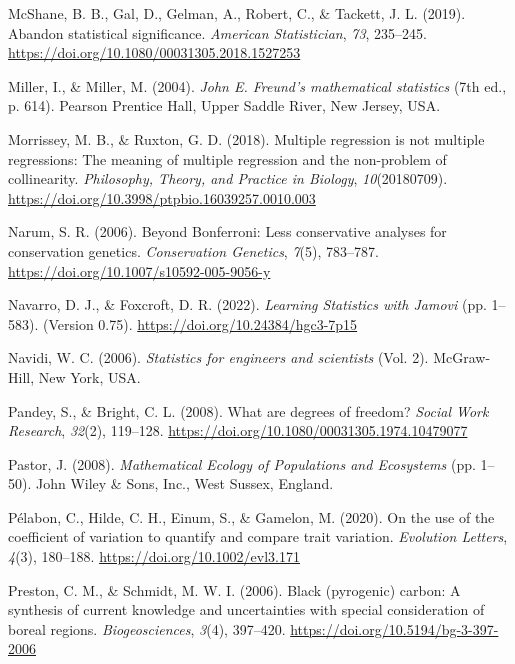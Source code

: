 \documentclass[
  openany]{krantz}
\newlength{\cslhangindent}
\newlength{\cslentryspacingunit} %
\newenvironment{CSLReferences}[2] %
 {%
  \setlength{\parindent}{0pt}
  \ifodd #1
  \let\oldpar\par
  \def\par{\hangindent=\cslhangindent\oldpar}
  \fi
  \setlength{\parskip}{#2\cslentryspacingunit}
 }%
 {}
\begin{document}
\begin{CSLReferences}{1}{0}
\leavevmode{}%
McShane, B. B., Gal, D., Gelman, A., Robert, C., \& Tackett, J. L. (2019). Abandon statistical significance. \emph{American Statistician}, \emph{73}, 235--245. \url{https://doi.org/10.1080/00031305.2018.1527253}

\leavevmode{}%
Miller, I., \& Miller, M. (2004). \emph{{John E. Freund's mathematical statistics}} (7th ed., p. 614). Pearson Prentice Hall, Upper Saddle River, New Jersey, USA.

\leavevmode{}%
Morrissey, M. B., \& Ruxton, G. D. (2018). Multiple regression is not multiple regressions: The meaning of multiple regression and the non-problem of collinearity. \emph{Philosophy, Theory, and Practice in Biology}, \emph{10}(20180709). \url{https://doi.org/10.3998/ptpbio.16039257.0010.003}

\leavevmode{}%
Narum, S. R. (2006). {Beyond Bonferroni: Less conservative analyses for conservation genetics}. \emph{Conservation Genetics}, \emph{7}(5), 783--787. \url{https://doi.org/10.1007/s10592-005-9056-y}

\leavevmode{}%
Navarro, D. J., \& Foxcroft, D. R. (2022). \emph{{Learning Statistics with Jamovi}} (pp. 1--583). (Version 0.75). \url{https://doi.org/10.24384/hgc3-7p15}

\leavevmode{}%
Navidi, W. C. (2006). \emph{Statistics for engineers and scientists} (Vol. 2). McGraw-Hill, New York, USA.

\leavevmode{}%
Pandey, S., \& Bright, C. L. (2008). {What are degrees of freedom?} \emph{Social Work Research}, \emph{32}(2), 119--128. \url{https://doi.org/10.1080/00031305.1974.10479077}

\leavevmode{}%
Pastor, J. (2008). \emph{{Mathematical Ecology of Populations and Ecosystems}} (pp. 1--50). John Wiley \& Sons, Inc., West Sussex, England.

\leavevmode{}%
Pélabon, C., Hilde, C. H., Einum, S., \& Gamelon, M. (2020). {On the use of the coefficient of variation to quantify and compare trait variation}. \emph{Evolution Letters}, \emph{4}(3), 180--188. \url{https://doi.org/10.1002/evl3.171}

\leavevmode{}%
Preston, C. M., \& Schmidt, M. W. I. (2006). {Black (pyrogenic) carbon: A synthesis of current knowledge and uncertainties with special consideration of boreal regions}. \emph{Biogeosciences}, \emph{3}(4), 397--420. \url{https://doi.org/10.5194/bg-3-397-2006}


\end{CSLReferences}
\end{document}
